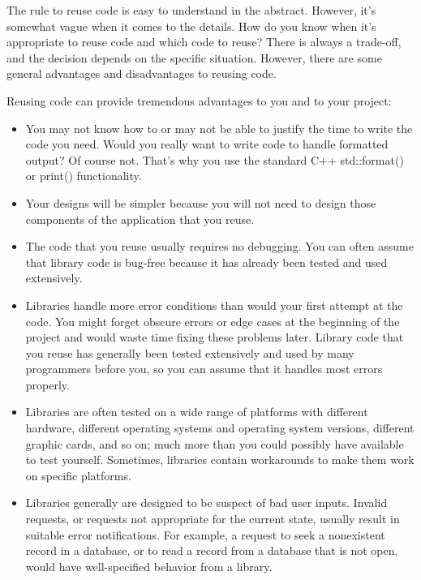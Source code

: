 
The rule to reuse code is easy to understand in the abstract. However, it’s somewhat vague when it comes to the details. How do you know when it’s appropriate to reuse code and which code to reuse? There is always a trade-off, and the decision depends on the specific situation. However, there are some general advantages and disadvantages to reusing code.


Reusing code can provide tremendous advantages to you and to your project:

\begin{itemize}
\item
You may not know how to or may not be able to justify the time to write the code you need. Would you really want to write code to handle formatted output? Of course not. That’s why you use the standard C++ std::format() or print() functionality.

\item
Your designs will be simpler because you will not need to design those components of the application that you reuse.

\item
The code that you reuse usually requires no debugging. You can often assume that library code is bug-free because it has already been tested and used extensively.

\item
Libraries handle more error conditions than would your first attempt at the code. You might forget obscure errors or edge cases at the beginning of the project and would waste time fixing these problems later. Library code that you reuse has generally been tested extensively and used by many programmers before you, so you can assume that it handles most errors properly.

\item
Libraries are often tested on a wide range of platforms with different hardware, different operating systems and operating system versions, different graphic cards, and so on; much more than you could possibly have available to test yourself. Sometimes, libraries contain workarounds to make them work on specific platforms.

\item
Libraries generally are designed to be suspect of bad user inputs. Invalid requests, or requests not appropriate for the current state, usually result in suitable error notifications. For example, a request to seek a nonexistent record in a database, or to read a record from a database that is not open, would have well-specified behavior from a library.


\end{itemize}
